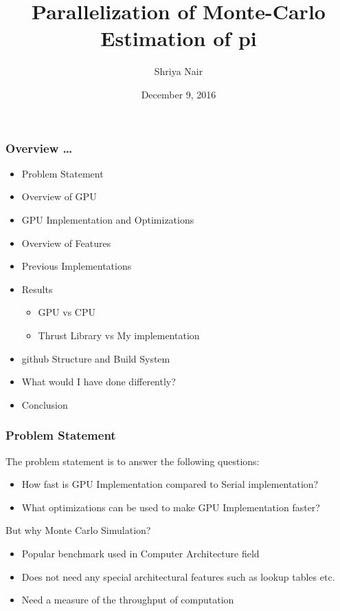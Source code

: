 \documentclass[mathserif]{beamer}
\date{December 9, 2016}
\author[Shriya Nair]{Shriya Nair}
\institute{The University of Texas at Austin}
\title[GPU Monte-Carlo pi]{Parallelization of Monte-Carlo Estimation of pi}
\begin{document}
\begin{frame}
\begin{center}
\end{center}
\titlepage
\begin{flushright}
\end{flushright}
\end{frame}

\begin{frame}
\frametitle{Overview \ldots}

\begin{itemize}
\item Problem Statement
\item Overview of GPU
\item GPU Implementation and Optimizations
\item Overview of Features
\item Previous Implementations
\item Results   
\begin{itemize}
\item GPU vs CPU
\item Thrust Library vs My implementation
\end{itemize}
\item github Structure and Build System
\item What would I have done differently?
\item Conclusion
\end{itemize}

\end{frame}

\begin{frame}
\frametitle{Problem Statement}

The problem statement is to answer the following questions: 
\begin{itemize}
\item How fast is GPU Implementation compared to Serial implementation?
\item What optimizations can be used to make GPU Implementation faster? 
\end{itemize}
But why Monte Carlo Simulation?
\begin{itemize}
\item Popular benchmark used in Computer Architecture field  
\item Does not need any special architectural features such as lookup tables etc. 
\item Need a measure of the throughput of computation 
\end{itemize}
\end{frame}
\end{document}
